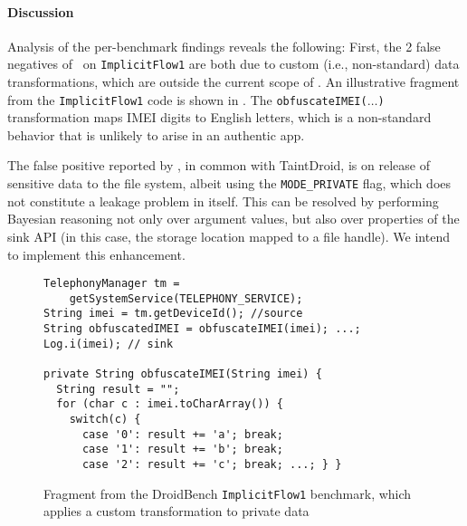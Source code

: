 
\vspace{-0.1in}
\paragraph{Discussion}
Analysis of the per-benchmark findings reveals the following:
First, the 2 false negatives of
\Tool\ on {\tt ImplicitFlow1} are both due to custom (i.e., non-standard) data transformations, which are outside the current scope of \Tool. An illustrative fragment from the {\tt ImplicitFlow1} code is shown in . The {\tt obfuscateIMEI($\ldots$)} transformation maps IMEI digits to English letters, which is a non-standard behavior that is unlikely to arise in an authentic app.

The false positive reported by \Tool, in common with TaintDroid, is on release of sensitive data to the file system, albeit using the {\tt MODE\_PRIVATE} flag, which does not constitute a leakage problem in itself. This can be resolved by performing Bayesian reasoning not only over argument values, but also over properties of the sink API (in this case, the storage location mapped to a file handle). We intend to implement this enhancement.

\begin{figure}
\begin{lstlisting}
TelephonyManager tm =
    getSystemService(TELEPHONY_SERVICE);
String imei = tm.getDeviceId(); //source
String obfuscatedIMEI = obfuscateIMEI(imei); ...;
Log.i(imei); // sink

private String obfuscateIMEI(String imei) {
  String result = "";
  for (char c : imei.toCharArray()) {
    switch(c) {
      case '0': result += 'a'; break;
      case '1': result += 'b'; break;
      case '2': result += 'c'; break; ...; } }
\end{lstlisting}
\caption{\label{Fi:dataTransform} Fragment from the DroidBench {\tt ImplicitFlow1} benchmark, which applies a custom transformation to private data}
\end{figure}


